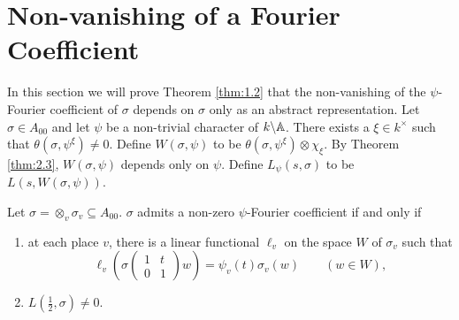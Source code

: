 \section{Non-vanishing of a Fourier Coefficient}


In this section we will prove Theorem \ref{thm:1.2} that the non-vanishing of the $\psi$-Fourier coefficient of $\sigma$ depends on $\sigma$ only as an abstract representation.
Let $\sigma \in A_{00}$ and let $\psi$ be a non-trivial character of $k \backslash \mathbb{A}$.
There exists a $\xi \in k^\times$ such that $\theta(\sigma, \psi^\xi) \neq 0$.
Define $W(\sigma, \psi)$ to be $\theta(\sigma, \psi^\xi) \otimes \chi_\xi$.
By Theorem \ref{thm:2.3}, $W(\sigma, \psi)$ depends only on $\psi$.
Define $L_\psi(s, \sigma)$ to be $L(s, W(\sigma, \psi))$.

\begin{theorem}
\label{thm:4.1}
Let $\sigma = \otimes_v \sigma_v \subseteq A_{00}$.
$\sigma$ admits a non-zero $\psi$-Fourier coefficient if and only if
\begin{enumerate}[label=(\roman*)]
    \item at each place $v$, there is a linear functional $\ell_v$ on the space $W$ of $\sigma_v$ such that
    \[
        \ell_v\left(\sigma\begin{pmatrix}
            1 & t \\ 0 & 1
        \end{pmatrix}w\right) = \psi_v(t) \sigma_v(w) \qquad (w \in W),
    \]
    \item $L(\frac{1}{2}, \sigma) \neq 0$.
\end{enumerate}
\end{theorem}


